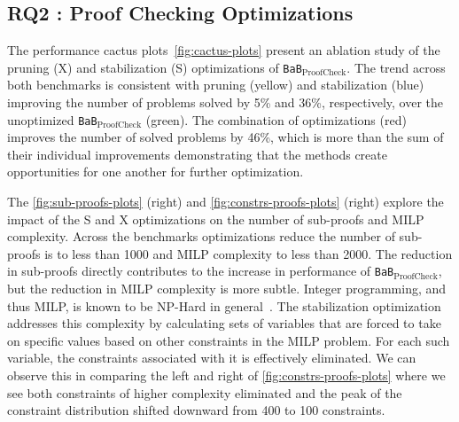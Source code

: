 \documentclass[oneside,11pt,dvipsnames]{book}
\newcommand{\ignore}[1]{}
\newcommand{\proofcheck}{\texttt{BaB$_{\text{ProofCheck}}$}}
\begin{document}
\subsection{RQ2 : Proof Checking Optimizations}
\label{sec:rq2}
The performance cactus plots~\autoref{fig:cactus-plots} present an ablation
study of the 
pruning (X) and stabilization (S) optimizations of \proofcheck{}.
The trend across both benchmarks is consistent with pruning (yellow) and stabilization (blue)
 improving the number of problems solved by 5\% and 36\%, respectively, over the unoptimized
\proofcheck{} (green).
The combination of optimizations (red) improves the number of solved problems by 46\%, which is more than the sum of their individual improvements demonstrating that the methods create opportunities for one another for further optimization.
\ignore{
- neither X nor S: 168 (F) + 88 (C) = 256
- X: 175 (F) + 93 (C) = 268
- S: 178 (F) + 170 (C) = 348
}

The \autoref{fig:sub-proofs-plots} (right) and \autoref{fig:constrs-proofs-plots} (right) explore the impact of the S and X optimizations on the number of sub-proofs and MILP complexity.  Across the benchmarks optimizations reduce 
the number of sub-proofs is to less than 1000 and
MILP complexity to less than 2000.   
The reduction in sub-proofs directly contributes to the increase
in performance of \proofcheck{}, but the reduction in
MILP complexity is more subtle.   
Integer programming, and thus MILP, is known to be
NP-Hard in general~\cite{garey1979computers}.
The stabilization optimization addresses this complexity by
calculating sets of variables that are forced to take on specific
values based on other constraints in the MILP problem.  For each
such variable, the constraints associated with it is effectively
eliminated.  We can observe this in comparing the left and
right of \autoref{fig:constrs-proofs-plots} where we see both
constraints of higher complexity eliminated and the peak of
the constraint distribution shifted downward from 400 to 100
constraints.  

\ignore{
Sub-problem size
- without S+X:
    + mean: 388
    + std: 1062
- with S+X
    + mean: 142
    + std: 152

MILP complexity
- without S+X: 
    + mean: 329
    + std: 274
- with S+X
    + mean: 493
    + std 449

We performed an analysis of the relationship between size of constraints and number of sub-proofs and determined that these factors are not strongly correlated.
For example, there is a 1 layer CNN model with 27k parameters whose verification
generates 680 sub-proofs where the complexity of the constraints in that proof are at most 109. 
On the other end of the spectrum, verification of a 2 layer CNN model with 180k parameters only requires 81 sub-proofs, but those proofs consist of constraints with complexity of at least 1721.
}
\end{document}
